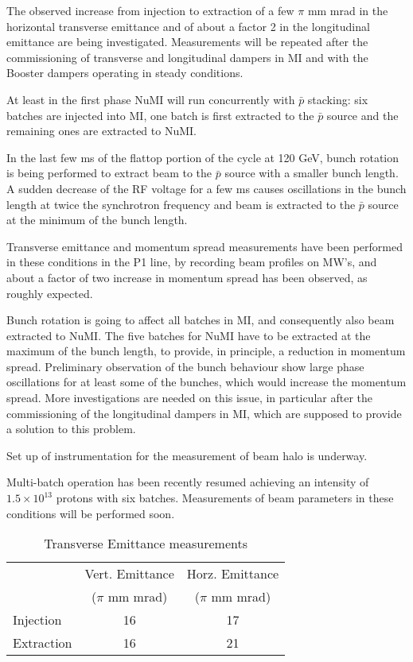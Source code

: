 \documentclass{article}
\begin{document}
The observed increase from injection to extraction of a few $\pi$ mm mrad 
in the horizontal transverse emittance and of about a factor 2 in the 
longitudinal emittance are being investigated. Measurements will be 
repeated after the commissioning of transverse and longitudinal dampers 
in MI and with the Booster dampers operating in steady conditions.  

At least in the first phase NuMI will run concurrently with $\bar p$
stacking: six batches are injected into MI, one batch is first extracted 
to the $\bar p$ source and the remaining ones are extracted to NuMI. 

In the last few ms of the flattop portion of the cycle at 120 GeV, 
bunch rotation is being performed to extract beam to the $\bar p$ source 
with a smaller bunch length. A sudden decrease of the RF voltage for a few
ms causes oscillations in the bunch length at twice the synchrotron
frequency and beam is extracted to the $\bar p$ source at the minimum 
of the bunch length. 

Transverse emittance and momentum spread measurements have 
been performed in these conditions in the P1 line, by recording beam profiles 
on MW's, and about a factor of two increase in momentum spread has been 
observed, as roughly expected. 

Bunch rotation is going to affect all batches in MI, 
and consequently also beam extracted to NuMI. The five batches for NuMI
have to be extracted at the maximum of the bunch length, to provide,
in principle, a reduction in momentum spread.
Preliminary observation of the bunch behaviour show large phase 
oscillations for at least some of the bunches, which would increase 
the momentum spread. More investigations are needed on this issue, in
particular after the commissioning of the longitudinal dampers in MI,
which are supposed to provide a solution to this problem.

Set up of instrumentation for the measurement of beam halo is underway.

Multi-batch operation has been recently resumed achieving an intensity of 
$1.5 \times 10^{13}$ protons with six batches. Measurements of beam 
parameters in these conditions will be performed soon.

\begin {table} [h]
\begin {tabular}{|l|c|c|}
\hline
 & Vert. Emittance & Horz. Emittance \\
 & ($\pi$ mm mrad) & ($\pi$ mm mrad) \\
\hline
Injection & 16 & 17 \\
\hline
Extraction & 16 & 21 \\
\hline
\end{tabular}
\caption {\label {tab:transvemit} Transverse Emittance measurements}
\end {table}
\end{document}

